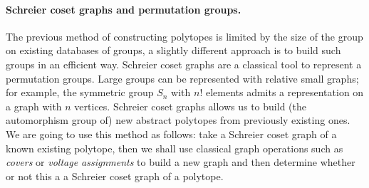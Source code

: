 %


\paragraph{Schreier coset graphs and permutation groups.}
The previous method of constructing polytopes is limited by the size of the group on existing databases of groups, a slightly different approach is to build such groups in an efficient way.
Schreier coset graphs are a classical tool to represent a permutation groups.
Large groups can be represented with relative small graphs; for example, the symmetric group $S_{n}$ with $n!$ elements admits a representation on a graph with $n$ vertices.
Schreier coset graphs allows us to build (the automorphism group of) new abstract polytopes from previously existing ones.
We are going to use this method as follows: take a Schreier coset graph of a known existing polytope, then we shall use classical graph operations such as \emph{covers} or \emph{voltage assignments} to build a new graph and then determine whether or not this a a Schreier coset graph of a polytope.

